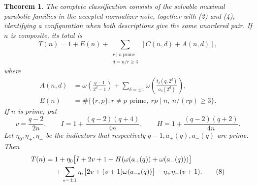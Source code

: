 \documentclass[11pt,a4paper]{article}
\newtheorem{theorem}{Theorem}
\begin{document}
\begin{theorem}\label{global}
The complete classification consists of the solvable maximal
parabolic families in the accepted normalizer note, together
with (2) and (4), identifying a configuration when both descriptions
give the same unordered pair. If $n$ is composite, its total is
\begin{equation}
 T(n)=1+E(n)+\sum_{\substack{r\mid n\ \text{prime}\\d=n/r\ge3}}
                         [C(n,d)+A(n,d)],               \tag{7}
\end{equation}
where
\begin{align*}
 A(n,d)&=\omega\!\left(\frac{q-1}{2^d-1}\right)
 +\sum_{\delta=\pm1}\omega\!\left(
     \frac{t_\delta(q,2^d)}{a_\delta(2^d)}\right),\\
 E(n)&=\#\{\{r,p\}:r\ne p\text{ prime},\ rp\mid n,\ n/(rp)\ge3\}.
\end{align*}
If $n$ is prime, put
\[
 v=\frac{q-2}{2n},\qquad
 I=1+\frac{(q-2)(q+4)}{4n},\qquad
 H=1+\frac{(q-2)(q+2)}{4n}.
\]
Let $\eta_0,\eta_+,\eta_-$ be the indicators that respectively
$q-1,a_+(q),a_-(q)$ are prime. Then
\begin{align}
 T(n)={}&1+\eta_0\bigl[I+2v+1+
                 H(\omega(a_+(q))+\omega(a_-(q)))\bigr]\notag\\
 &+\sum_{\epsilon=\pm1}\eta_\epsilon
       \bigl[2v+(v+1)\omega(a_{-\epsilon}(q))\bigr]
       -\eta_+\eta_-(v+1).                              \tag{8}
\end{align}
\end{theorem}
\end{document}
